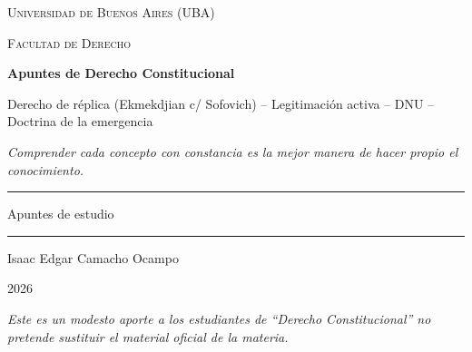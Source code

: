 \documentclass[12pt,oneside]{book}
\newcommand{\universidad}{Universidad de Buenos Aires (UBA)}
\newcommand{\facultad}{Facultad de Derecho}
\newcommand{\titulo}{Apuntes de Derecho Constitucional}
\newcommand{\temas}{Derecho de r\'eplica (Ekmekdjian c/ Sofovich) -- Legitimaci\'on activa -- DNU -- Doctrina de la emergencia}
\newcommand{\autor}{Isaac Edgar Camacho Ocampo}
\newcommand{\anio}{2026}
\newlength{\cornellL}
\newlength{\cornellR}
\newlength{\cornellW}
\begin{document}
\setlength{\cornellL}{0.25\textwidth}
\setlength{\cornellR}{\dimexpr\textwidth-\cornellL-4\tabcolsep\relax}
\setlength{\cornellW}{\dimexpr\textwidth-2\tabcolsep\relax}

\begin{titlepage}

\thispagestyle{empty}

\begin{center}

\vspace*{1cm}

{\large \textsc{\universidad}}

\vspace{0.2cm}

{\large \textsc{\facultad}}

\vspace{3cm}

{\Huge \textbf{\titulo}}

\vspace{0.8cm}

{\large \temas}

\vspace{0.8cm}

\textit{\small Comprender cada concepto con constancia es la mejor manera de hacer propio el conocimiento.}

\vspace{1.2cm}

\rule{0.70\textwidth}{0.5pt}

\vspace{0.5cm}

{\large Apuntes de estudio}

\vspace{0.5cm}

\rule{0.70\textwidth}{0.5pt}

\vfill

{\large \autor}

\vspace{0.3cm}

{\large \anio}

\end{center}

\vfill

\begin{flushleft}
\textit{Este es un modesto aporte a los estudiantes de ``Derecho Constitucional'' no pretende sustituir el material oficial de la materia.}
\end{flushleft}

\end{titlepage}
\end{document}
